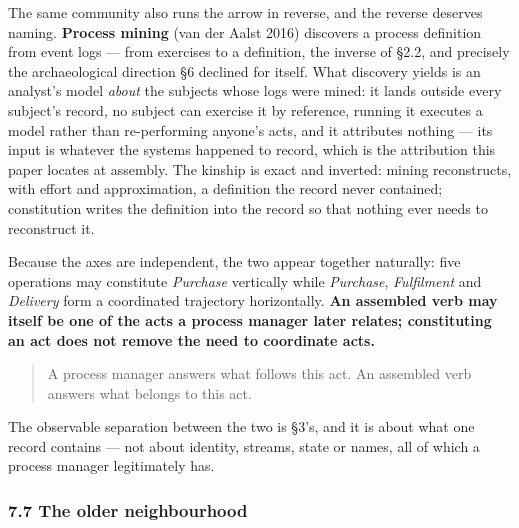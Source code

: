 \documentclass[
]{article}
\begin{document}
The same community also runs the arrow in reverse, and the reverse
deserves naming. \textbf{Process mining} (van der Aalst 2016) discovers
a process definition from event logs --- from exercises to a definition,
the inverse of §2.2, and precisely the archaeological direction §6
declined for itself. What discovery yields is an analyst's model
\emph{about} the subjects whose logs were mined: it lands outside every
subject's record, no subject can exercise it by reference, running it
executes a model rather than re-performing anyone's acts, and it
attributes nothing --- its input is whatever the systems happened to
record, which is the attribution this paper locates at assembly. The
kinship is exact and inverted: mining reconstructs, with effort and
approximation, a definition the record never contained; constitution
writes the definition into the record so that nothing ever needs to
reconstruct it.

Because the axes are independent, the two appear together naturally:
five operations may constitute \emph{Purchase} vertically while
\emph{Purchase}, \emph{Fulfilment} and \emph{Delivery} form a
coordinated trajectory horizontally. \textbf{An assembled verb may
itself be one of the acts a process manager later relates; constituting
an act does not remove the need to coordinate acts.}

\begin{quote}
A process manager answers what follows this act. An assembled verb
answers what belongs to this act.
\end{quote}

The observable separation between the two is §3's, and it is about what
one record contains --- not about identity, streams, state or names, all
of which a process manager legitimately has.

\subsubsection{7.7 The older
neighbourhood}\label{the-older-neighbourhood}
\end{document}
